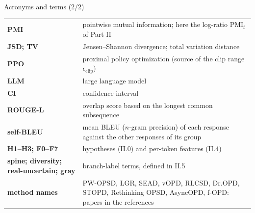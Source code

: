\documentclass[aspectratio=169,11pt]{beamer}
\begin{document}
\begin{frame}{Acronyms and terms (2/2)}
\footnotesize
\setlength{\tabcolsep}{4pt}\renewcommand{\arraystretch}{1.2}
\begin{tabularx}{\linewidth}{@{}>{\bfseries}l Y@{}}
\toprule
PMI & pointwise mutual information; here the log-ratio $\mathrm{PMI}_t$ of Part II\\
JSD; TV & Jensen--Shannon divergence; total variation distance\\
PPO & proximal policy optimization (source of the clip range $\epsilon_{\mathrm{clip}}$)\\
LLM & large language model\\
CI & confidence interval\\
ROUGE-L & overlap score based on the longest common subsequence\\
self-BLEU & mean BLEU ($n$-gram precision) of each response against the other responses of its group\\
H1--H3; F0--F7 & hypotheses (II.0) and per-token features (II.4)\\
spine; diversity; real-uncertain; gray & branch-label terms, defined in II.5\\
method names & PW-OPSD, LGR, SEAD, vOPD, RLCSD, Dr.OPD, STOPD, Rethinking OPSD, AsyncOPD, f-OPD: papers in the references\\
\bottomrule
\end{tabularx}
\end{frame}
\end{document}
